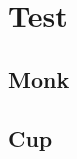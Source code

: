\chapter{Test} %
\label{cha:test}

	\section{Monk} %
	\label{sec:monk}	

	\section{Cup} %
	\label{sec:cup}

	
